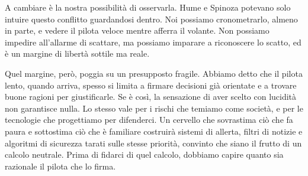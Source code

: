 A cambiare è la nostra possibilità di osservarla. Hume e Spinoza potevano solo intuire questo conflitto guardandosi dentro. Noi possiamo cronometrarlo, almeno in parte, e vedere il pilota veloce mentre afferra il volante. Non possiamo impedire all'allarme di scattare, ma possiamo imparare a riconoscere lo scatto, ed è un margine di libertà sottile ma reale.

Quel margine, però, poggia su un presupposto fragile. Abbiamo detto che il pilota lento, quando arriva, spesso si limita a firmare decisioni già orientate e a trovare buone ragioni per giustificarle. Se è così, la sensazione di aver scelto con lucidità non garantisce nulla. Lo stesso vale per i rischi che temiamo come società, e per le tecnologie che progettiamo per difenderci. Un cervello che sovrastima ciò che fa paura e sottostima ciò che è familiare costruirà sistemi di allerta, filtri di notizie e algoritmi di sicurezza tarati sulle stesse priorità, convinto che siano il frutto di un calcolo neutrale. Prima di fidarci di quel calcolo, dobbiamo capire quanto sia razionale il pilota che lo firma.

